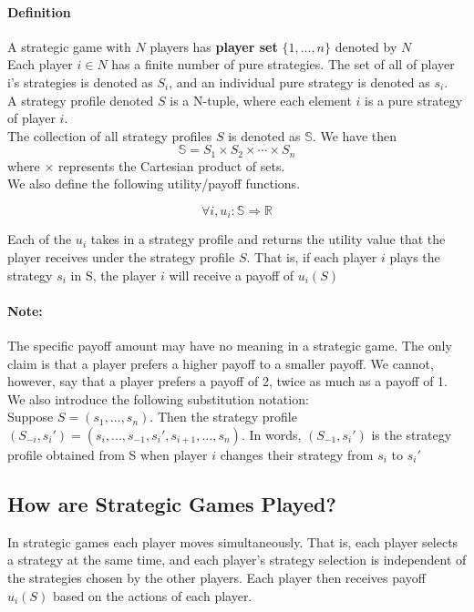 \documentclass[12pt]{article}
\newcommand{\Note}{\paragraph{Note:}}
\newcommand{\Definition}{\paragraph{Definition}}
\begin{document}
	\Definition A strategic game with $N$ players has \textbf{player set} $\{1,...,n\}$ denoted by $N$\\
	
	Each player $i \in N$ has a finite number of pure strategies. The set of all of player i's strategies is denoted as $S_i$, and an individual pure strategy is denoted as $s_i$.\\
	
	A strategy profile denoted $S$ is a N-tuple, where each element $i$ is a pure strategy of player $i$.\\
	
	The collection of all strategy profiles $S$ is denoted as $\mathbb{S}$. We have then 
	\begin{equation*}
	\mathbb{S} = S_1 \times S_2 \times \cdots \times S_n
	\end{equation*} where $\times$ represents the Cartesian product of sets.\\
	
	We also define the following utility/payoff functions.
	
	\begin{equation*}
	\forall i, u_i : \mathbb{S} \Rightarrow \mathbb{R}
	\end{equation*}
	
	Each of the $u_i$ takes in a strategy profile and returns the utility value that the player receives under the strategy profile $S$. That is, if each player $i$ plays the strategy $s_i$ in S, the player $i$ will receive a payoff of $u_i(S)$
	
	\Note The specific payoff amount may have no meaning in a strategic game. The only claim is that a player prefers a higher payoff to a smaller payoff. We cannot, however, say that a player prefers a payoff of 2, twice as much as a payoff of 1.\\
	
	We also introduce the following substitution notation:\\
	
	Suppose $S = (s_1,...,s_n)$. Then the strategy profile $(S_{-i},s_i') = (s_i,...,s_{-1},s_i',s_{i+1},...,s_n)$. In words, $(S_{-1},s_i')$ is the strategy profile obtained from S when player $i$ changes their strategy from $s_i$ to $s_i'$\\
	
	\subsection{How are Strategic Games Played?}
	In strategic games each player moves simultaneously. That is, each player selects a strategy at the same time, and each player’s strategy selection is independent of the strategies chosen by the other players. Each player then receives payoff $u_i(S)$ based on the actions of each player.\\
	
\end{document}
